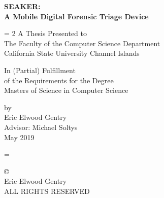 \documentclass[12pt]{article}
\newcommand{\A}{\mathcal{A}}
\begin{document}
\begin{titlepage}
\begin{center}
{\Large \bfseries SEAKER:\protect\\A Mobile Digital Forensic Triage Device \par}

\vspace{2 cm}
\baselineskip = 2\baselineskip
A Thesis Presented to \\
The Faculty of the Computer Science Department\\
California State University Channel Islands

\vspace{1 cm}

In (Partial) Fulfillment\\
of the Requirements for the Degree\\
Masters of Science in Computer Science\\

\vspace{1 cm }

\vfill

by \\
Eric Elwood Gentry\\
Advisor: Michael Soltys\\
May 2019
\end{center}
\end{titlepage}
\baselineskip = \baselineskip

\newpage
\null
\vfill
\begin{flushleft}
\copyright{}\\
Eric Elwood Gentry\\
ALL RIGHTS RESERVED
\end{flushleft}
\newpage
\end{document}
